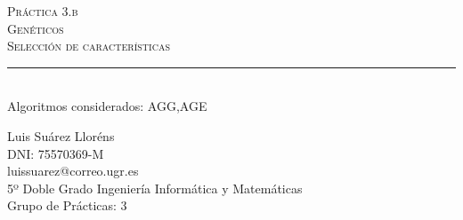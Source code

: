\begin{titlepage}

\newcommand{\HRule}{\rule{\linewidth}{0.5mm}} %

\center %
 

\textsc{\LARGE Práctica 3.b}\\[1.0cm] %
\textsc{\Large Genéticos}\\[0.5cm] %
\textsc{\large Selección de características}\\[0.5cm] %


\HRule \\[0.4cm]
{Algoritmos considerados: AGG,AGE}\\[0.4cm] %

 

\begin{minipage}{1\textwidth}
\begin{flushleft} \large
Luis Suárez Lloréns\\
DNI: 75570369-M\\
luissuarez@correo.ugr.es\\
5º Doble Grado Ingeniería Informática y Matemáticas\\
Grupo de Prácticas: 3
\end{flushleft}
\end{minipage}




\end{titlepage}
